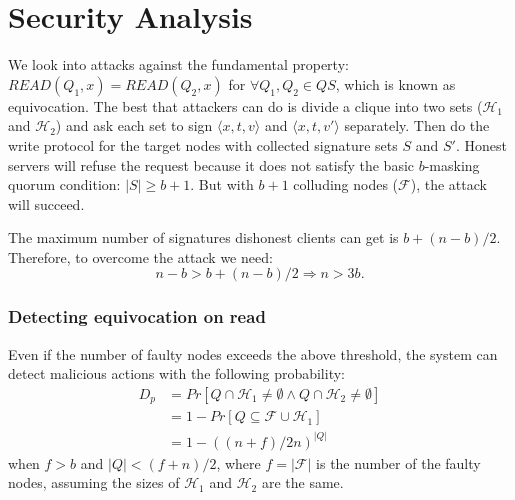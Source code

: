 \section{Security Analysis}
We look into attacks against the fundamental property:
$READ(Q_1,x) = READ(Q_2,x)$ for $\forall Q_1, Q_2 \in QS$, which is
known as equivocation.  The best that attackers can do is divide a
clique into two sets ($\mathcal{H}_1$ and $\mathcal{H}_2$) and ask
each set to sign $\langle x,t,v \rangle$ and $\langle x,t,v' \rangle$
separately. Then do the {\sf write} protocol for the target nodes with
collected signature sets $S$ and $S'$. Honest servers will refuse the
request because it does not satisfy the basic $b$-masking quorum
condition: $|S| \geq b+1$. But with $b+1$ colluding nodes
($\mathcal{F}$), the attack will succeed.

\ifdefined\ABSTRACT
\else
\newcommand{\slice}[4]{
  \pgfmathparse{0.5*#1+0.5*#2}
  \let\midangle\pgfmathresult

  \draw[thick,fill=black!10] (0,0) -- (#1:1) arc (#1:#2:1) -- cycle;

  \node[label=\midangle:#4] at (\midangle:1) {};

  \pgfmathparse{min((#2-#1-10)/110*(-0.3),0)}
  \let\temp\pgfmathresult
  \pgfmathparse{max(\temp,-0.5) + 0.8}
  \let\innerpos\pgfmathresult
  \node at (\midangle:\innerpos) {#3};
}

\fi

The maximum number of signatures dishonest clients can get is
$b+(n-b)/2$. Therefore, to overcome the attack we need:
\[ n-b > b+(n-b)/2 \Rightarrow n > 3b. \]

\subsubsection*{Detecting equivocation on {\sf read}}
Even if the number of faulty nodes exceeds the above threshold, the
system can detect malicious actions with the following probability:
\begin{align*}
  D_p &= Pr[Q \cap \mathcal{H}_1 \neq \emptyset \wedge Q \cap
        \mathcal{H}_2 \neq \emptyset] \\
      & = 1 - Pr[Q \subseteq \mathcal{F} \cup \mathcal{H}_1] \\
      & = 1 - ((n + f) / 2n)^{|Q|}
\end{align*}
when $f > b$ and $|Q| < (f + n)/2$, where $f = |\mathcal{F}|$ is the
number of the faulty nodes, assuming the sizes of $\mathcal{H}_1$ and
$\mathcal{H}_2$ are the same.

